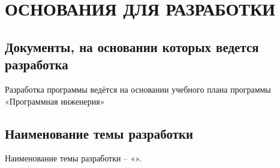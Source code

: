\section{ОСНОВАНИЯ ДЛЯ РАЗРАБОТКИ}

\subsection{Документы, на основании которых ведется разработка}
    Разработка программы ведётся на основании учебного плана программы «Программная инженерия»
    

\subsection{Наименование темы разработки}
    Наименование темы разработки – «\docTitle».

\clearpage